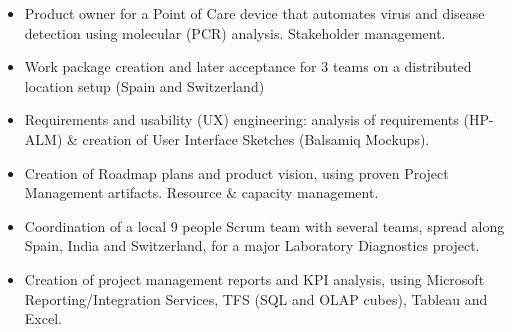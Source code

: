\documentclass[10pt,a4paper]{altacv}
\begin{document}

\begin{fullwidth}
\makecvheader
\end{fullwidth}


\begin{itemize}
	\item Product owner for a Point of Care device that automates virus and disease detection using molecular (PCR) analysis. Stakeholder management.
	\item Work package creation and later acceptance for 3 teams on a distributed location setup (Spain and Switzerland)
	\item Requirements and usability (UX) engineering: analysis of requirements (HP-ALM) \& creation of User Interface Sketches (Balsamiq Mockups).
	\item Creation of Roadmap plans and product vision, using proven Project Management artifacts. Resource \& capacity management.
\end{itemize}

\begin{itemize}
	\item Coordination of a local 9 people Scrum team with several teams, spread along Spain, India and Switzerland, for a major Laboratory Diagnostics project.
	\item Creation of project management reports and KPI analysis, using Microsoft Reporting/Integration Services, TFS (SQL and OLAP cubes), Tableau and Excel.
\end{itemize}
\end{document}
